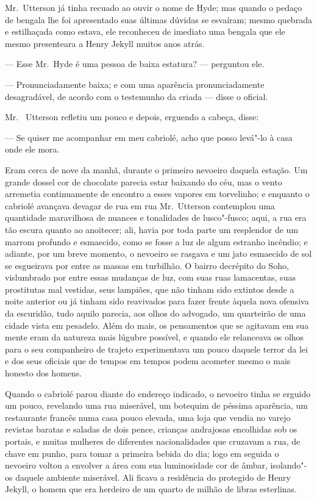 Mr.~Utterson já tinha recuado ao ouvir o nome de Hyde; mas quando o
pedaço de bengala lhe foi apresentado suas últimas dúvidas se esvaíram;
mesmo quebrada e estilhaçada como estava, ele reconheceu de imediato
uma bengala que ele mesmo presenteara a Henry Jekyll muitos anos atrás.

--- Esse Mr.~Hyde é uma pessoa de baixa estatura? --- perguntou ele.

--- Pronunciadamente baixa; e com uma aparência pronunciadamente
desagradável, de acordo com o testemunho da criada --- disse o oficial.

Mr.~ Utterson refletiu um pouco e depois, erguendo a cabeça, disse: 

--- Se quiser me acompanhar em meu cabriolé, acho que posso levá"-lo à
casa onde ele mora.

Eram cerca de nove da manhã, durante o primeiro nevoeiro daquela
estação.  Um grande dossel cor de chocolate parecia estar baixando do
céu, mas o vento arremetia continuamente de encontro a esses vapores em
torvelinho; e enquanto o cabriolé avançava devagar de rua em rua Mr.~Utterson 
contemplou uma quantidade maravilhosa de nuances e tonalidades
de lusco"-fusco; aqui, a rua era tão escura quanto ao anoitecer; ali,
havia por toda parte um resplendor de um marrom profundo e esmaecido,
como se fosse a luz de algum estranho incêndio; e adiante, por um breve
momento, o nevoeiro se rasgava e um jato esmaecido de sol se esgueirava
por entre as massas em turbilhão.  O bairro decrépito do Soho,
vislumbrado por entre essas mudanças de luz, com suas ruas lamacentas,
suas prostitutas mal vestidas, seus lampiões, que não tinham sido
extintos desde a noite anterior ou já tinham sido reavivados para fazer
frente àquela nova ofensiva da escuridão, tudo aquilo parecia, aos
olhos do advogado, um quarteirão de uma cidade vista em pesadelo.  Além
do mais, os pensamentos que se agitavam em sua mente eram da natureza
mais lúgubre possível, e quando ele relanceava os olhos para o seu
companheiro de trajeto experimentava um pouco daquele terror da lei e
dos seus oficiais que de tempos em tempos podem acometer mesmo o mais
honesto dos homens. 

Quando o cabriolé parou diante do endereço indicado, o nevoeiro tinha se
erguido um pouco, revelando uma rua miserável, um botequim de péssima
aparência, um restaurante francês numa casa pouco elevada, uma loja que
vendia no varejo revistas baratas e saladas de dois pence, crianças
andrajosas encolhidas sob os portais, e muitas mulheres de diferentes
nacionalidades que cruzavam a rua, de chave em punho, para tomar a
primeira bebida do dia; logo em seguida o nevoeiro voltou a envolver a
área com sua luminosidade cor de âmbar, isolando"-os daquele ambiente
miserável.  Ali ficava a residência do protegido de Henry Jekyll, o
homem que era herdeiro de um quarto de milhão de libras esterlinas.

